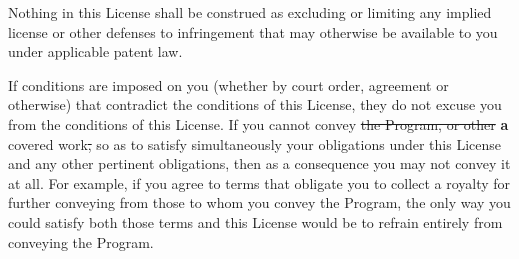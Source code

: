 \documentclass[11pt]{article}
\newcounter{v2section}
\newcounter{v3section}
\begin{document}
  Nothing in this License shall be construed as excluding or limiting
any implied license or other defenses to infringement that may otherwise
be available to you under applicable patent law.


  If conditions are imposed on you (whether by court order, agreement or
otherwise) that contradict the conditions of this License, they do not
excuse you from the conditions of this License.  If you cannot convey
\sout{the Program, or other} \textbf{a} covered work\sout{,} so as to
satisfy simultaneously your obligations under this License and any other
pertinent obligations, then as a consequence you may not convey it at
all.  For example, if you agree to terms that obligate you to collect a
royalty for further conveying from those to whom you convey the Program,
the only way you could satisfy both those terms and this License would
be to refrain entirely from conveying the Program.

\end{document}
